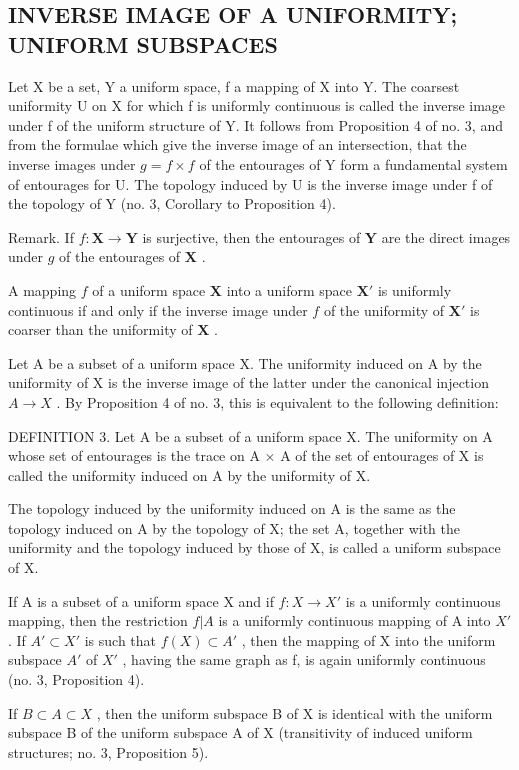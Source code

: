 \subsection{INVERSE IMAGE OF A UNIFORMITY; UNIFORM SUBSPACES}

Let X be a set, Y a uniform space, f a mapping of X into Y. The coarsest uniformity U on X for which f is uniformly continuous is called the inverse image under f of the uniform structure of Y. It follows from Proposition 4 of no. 3, and from the formulae which give the inverse image of an intersection, that the inverse images under \(g = f \times f\) of the entourages of Y form a fundamental system of entourages for U. The topology induced by U is the inverse image under f of the topology of Y (no. 3, Corollary to Proposition 4).

Remark. If \(f: \mathbf{X} \to \mathbf{Y}\) is surjective, then the entourages of \(\mathbf{Y}\) are the direct images under \(g\) of the entourages of \(\mathbf{X}\) .

A mapping \(f\) of a uniform space \(\mathbf{X}\) into a uniform space \(\mathbf{X}'\) is uniformly continuous if and only if the inverse image under \(f\) of the uniformity of \(\mathbf{X}'\) is coarser than the uniformity of \(\mathbf{X}\) .

Let A be a subset of a uniform space X. The uniformity induced on A by the uniformity of X is the inverse image of the latter under the canonical injection \(A \rightarrow X\) . By Proposition 4 of no. 3, this is equivalent to the following definition:

DEFINITION 3. Let A be a subset of a uniform space X. The uniformity on A whose set of entourages is the trace on A × A of the set of entourages of X is called the uniformity induced on A by the uniformity of X.

The topology induced by the uniformity induced on A is the same as the topology induced on A by the topology of X; the set A, together with the uniformity and the topology induced by those of X, is called a uniform subspace of X.

If A is a subset of a uniform space X and if \(f: X \to X'\) is a uniformly continuous mapping, then the restriction \(f|A\) is a uniformly continuous mapping of A into \(X'\) . If \(A' \subset X'\) is such that \(f(X) \subset A'\) , then the mapping of X into the uniform subspace \(A'\) of \(X'\) , having the same graph as f, is again uniformly continuous (no. 3, Proposition 4).

If \(B \subset A \subset X\) , then the uniform subspace B of X is identical with the uniform subspace B of the uniform subspace A of X (transitivity of induced uniform structures; no. 3, Proposition 5).

